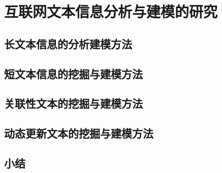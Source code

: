 \section{互联网文本信息分析与建模的研究}

\subsection{长文本信息的分析建模方法}

\subsection{短文本信息的挖掘与建模方法}

\subsection{关联性文本的挖掘与建模方法}

\subsection{动态更新文本的挖掘与建模方法}

\subsection{小结}

